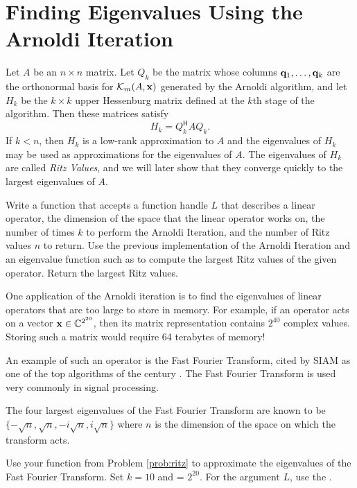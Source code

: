 \section*{Finding Eigenvalues Using the Arnoldi Iteration} %

Let $A$ be an $n \times n$ matrix.
Let $Q_k$ be the matrix whose columns $\mathbf{q}_1, \ldots, \mathbf{q}_k$ are the orthonormal basis for $\mathcal{K}_m(A, \mathbf{x})$ generated by the Arnoldi algorithm, and let $H_k$ be the $k\times k$ upper Hessenburg matrix defined at the $k$th stage of the algorithm.
Then these matrices satisfy
\begin{equation}\label{equ:HQA}
H_k = Q_k^{\mathsf H} A Q_k.
\end{equation}
If $k<n$, then $H_k$ is a low-rank approximation to $A$  and the eigenvalues of $H_k$ may be used as approximations for the eigenvalues of $A$.
The eigenvalues of $H_k$ are called \emph{Ritz Values}, and we will later show that they converge quickly to the largest eigenvalues of $A$.

\begin{problem}\label{prob:ritz}
Write a function that accepts a function handle $L$ that describes a linear operator, the dimension of the space  that the linear operator works on, the number of times $k$ to perform the Arnoldi Iteration, and the number of Ritz values $n$ to return.
Use the previous implementation of the Arnoldi Iteration and an eigenvalue function such as  to compute the largest Ritz values of the given operator.
Return the  largest Ritz values.
\end{problem}

One application of the Arnoldi iteration is to find the eigenvalues of linear operators that are too large to store in memory.
For example, if an operator acts on a vector $\mathbf{x} \in \mathbb{C}^{2^{20}}$, then its matrix representation contains $2^{40}$ complex values.
Storing such a matrix would require 64 terabytes of memory!

An example of such an operator is the Fast Fourier Transform, cited by SIAM as one of the top algorithms of the century \cite{cipra2000}.
The Fast Fourier Transform is used very commonly in signal processing.

\begin{problem}
\label{prob:fourier_eigs}
The four largest eigenvalues of the Fast Fourier Transform are known to be $\{ -\sqrt{n}, \sqrt{n}, -i\sqrt{n}, i\sqrt{n} \}$ where $n$ is the dimension of the space on which the transform acts.

Use your function from Problem \ref{prob:ritz} to approximate the eigenvalues of the Fast Fourier Transform.
Set $k = 10$ and  = $2^{20}$.
For the argument $L$, use the .
\end{problem}


